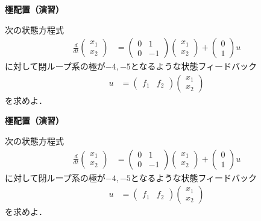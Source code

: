 \documentclass[a4paper,11pt]{jreport}
\begin{document}
\newpage

\noindent
{\bf 極配置（演習）}

次の状態方程式
\begin{align*}
	\frac{d}{dt}
	\left (
	\begin{array}{c}
	 x_1 \\ x_2 
	\end{array}
	\right )
	& = 
	\left (
	\begin{array}{cc}
	 0 & 1 \\
	 0 & -1
	\end{array}
	\right )
	\left (
	\begin{array}{c}
	 x_1 \\ x_2 
	\end{array}
	\right )
	+
	\left (
	\begin{array}{c}
	 0 \\ 1 
	\end{array}
	\right )
	u
\end{align*}
に対して閉ループ系の極が$-4,-5$となるような状態フィードバック
\begin{align*}
	u 
	&=
	\left (
	\begin{array}{cc}
	 f_1 & f_2
	\end{array}
	\right )
	\left (
	\begin{array}{c}
	 x_1 \\ x_2 
	\end{array}
	\right )
\end{align*}
を求めよ．

\newpage

\noindent
{\bf 極配置（演習）}

次の状態方程式
\begin{align*}
	\frac{d}{dt}
	\left (
	\begin{array}{c}
	 x_1 \\ x_2 
	\end{array}
	\right )
	& = 
	\left (
	\begin{array}{cc}
	 0 & 1 \\
	 0 & -1
	\end{array}
	\right )
	\left (
	\begin{array}{c}
	 x_1 \\ x_2 
	\end{array}
	\right )
	+
	\left (
	\begin{array}{c}
	 0 \\ 1 
	\end{array}
	\right )
	u
\end{align*}
に対して閉ループ系の極が$-4,-5$となるような状態フィードバック
\begin{align*}
	u 
	&=
	\left (
	\begin{array}{cc}
	 f_1 & f_2
	\end{array}
	\right )
	\left (
	\begin{array}{c}
	 x_1 \\ x_2 
	\end{array}
	\right )
\end{align*}
を求めよ．
\\
\end{document}
